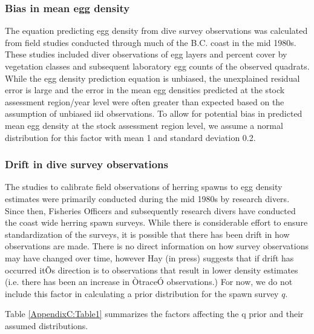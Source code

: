 \subsubsection{Bias in mean egg density}

The equation predicting egg density from dive survey observations was calculated from field studies conducted through much of the B.C. coast in the mid 1980s.  These studies included diver observations of egg layers and percent cover by vegetation classes and subsequent laboratory egg counts of the observed quadrats.  While the egg density prediction equation is unbiased, the unexplained residual error is large and the error in the mean egg densities predicted at the stock assessment region/year level were often greater than expected based on the assumption of unbiased iid observations. To allow for potential bias in predicted mean egg density at the stock assessment region level, we assume a normal distribution for this factor with mean 1 and standard deviation 0.2.  

\subsubsection{Drift in dive survey observations}

The studies to calibrate field observations of herring spawns to egg density estimates were primarily conducted during the mid 1980s by research divers.  Since then, Fisheries Officers and subsequently research divers have conducted the coast wide herring spawn surveys. While there is considerable effort to ensure standardization of the surveys, it is possible that there has been drift in how observations are made.  There is no direct information on how survey observations may have changed over time, however Hay (in press) suggests that if drift has occurred itÕs direction is to observations that result in lower density estimates (i.e. there has been an increase in ÒtraceÓ observations.)  For now, we do not include this factor in calculating a prior distribution for the spawn survey $q$. 

Table \ref{AppendixC:Table1} summarizes the factors affecting the q prior and their assumed distributions.

